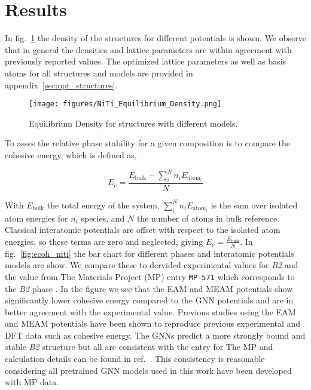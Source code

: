 \documentclass[preprint,colorlinks=true,linkcolor=black,citecolor=black]{elsarticle}
\begin{document}

\section{Results}
\label{sec:results}

In fig.~\ref{fig:opt_density} the density of the structures for
different potentials is shown. We observe that in general the
densities and lattice parameters are within agreement with previously
reported values. The optimized lattice parameters as well as basis
atoms for all structures and models are provided in
appendix~\ref{sec:opt_structures}. \par

\begin{figure}[ht!]
	\centering
	\texttt{[image: figures/NiTi\_Equilibrium\_Density.png]}
	\caption{Equilibrium Density for  structures with different
		models.}
	\label{fig:opt_density}
\end{figure}

To asses the relative phase stability for a given composition is to
compare the cohesive energy, which is defined as,

\begin{equation}
	\label{eq:cohesive_energy}
	E_{c} = \frac{E_{\text{bulk}} - \sum_{i}^{N} n_i E_{\text{atom}_i}}{N}
\end{equation}

With $E_{\text{bulk}}$ the total energy of the system,
$\sum_i^N n_i E_{\text{atom}_i}$ is the sum over isolated atom
energies for $n_i$ species, and $N$ the number of atoms in bulk
reference. Classical interatomic potentials are offset with respect to
the isolated atom energies, so these terms are zero and neglected,
giving $E_{c} = \frac{E_{\text{bulk}}}{N}$. In fig.~\ref{fig:ecoh_niti} the
bar chart for different phases and interatomic potentials models are
show. We compare these to dervided experimental values for
\textit{B2}\cite{Vandermause2024} and the value from The Materials
Project (MP) entry \texttt{MP-571} which corresponds to the
\textit{B2} phase \cite{MP--571}. In the figure we see that the EAM
and MEAM potentials show significantly lower cohesive energy compared
to the GNN potentials and are in better agreement with the
experimental value. Previous studies using the EAM and MEAM potentials
have been shown to reproduce previous experimental and DFT data
\cite{Haskins2016,Ko2015} such as cohesive energy. The GNNs predict a
more strongly bound and stable \textit{B2} structure but all are
consistent with the entry for The MP and calculation details can be
found in ref.~\cite{MP--571}. This consistency is reasonable
considering all pretrained GNN models used in this work have been
developed with MP data. \par
\end{document}
